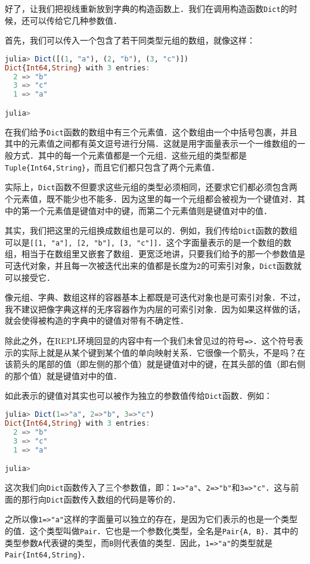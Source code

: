 好了，让我们把视线重新放到字典的构造函数上．我们在调用构造函数\verb|Dict|的时候，还可以传给它几种参数值．

首先，我们可以传入一个包含了若干同类型元组的数组，就像这样：
\begin{lstlisting}[language=julia]
julia> Dict([(1, "a"), (2, "b"), (3, "c")])
Dict{Int64,String} with 3 entries:
  2 => "b"
  3 => "c"
  1 => "a"

julia> 
\end{lstlisting}

在我们给予\verb|Dict|函数的数组中有三个元素值．这个数组由一个中括号包裹，并且其中的元素值之间都有英文逗号进行分隔．这就是用字面量表示一个一维数组的一般方式．其中的每一个元素值都是一个元组．这些元组的类型都是\verb|Tuple{Int64,String}|，而且它们都只包含了两个元素值．

实际上，\verb|Dict|函数不但要求这些元组的类型必须相同，还要求它们都必须包含两个元素值，既不能少也不能多．因为这里的每一个元组都会被视为一个键值对．其中的第一个元素值是键值对中的键，而第二个元素值则是键值对中的值．

其实，我们把这里的元组换成数组也是可以的．例如，我们传给\verb|Dict|函数的数组可以是\verb|[[1, "a"], [2, "b"], [3, "c"]]|．这个字面量表示的是一个数组的数组，相当于在数组里又嵌套了数组．更宽泛地讲，只要我们给予的那一个参数值是可迭代对象，并且每一次被迭代出来的值都是长度为\verb|2|的可索引对象，\verb|Dict|函数就可以接受它．

像元组、字典、数组这样的容器基本上都既是可迭代对象也是可索引对象．不过，我不建议把像字典这样的无序容器作为内层的可索引对象．因为如果这样做的话，就会使得被构造的字典中的键值对带有不确定性．

除此之外，在REPL环境回显的内容中有一个我们未曾见过的符号\verb|=>|．这个符号表示的实际上就是从某个键到某个值的单向映射关系．它很像一个箭头，不是吗？在该箭头的尾部的值（即左侧的那个值）就是键值对中的键，在其头部的值（即右侧的那个值）就是键值对中的值．

如此表示的键值对其实也可以被作为独立的参数值传给\verb|Dict|函数．例如：
\begin{lstlisting}[language=julia]
julia> Dict(1=>"a", 2=>"b", 3=>"c")
Dict{Int64,String} with 3 entries:
  2 => "b"
  3 => "c"
  1 => "a"

julia> 
\end{lstlisting}

这次我们向\verb|Dict|函数传入了三个参数值，即：\verb|1=>"a"|、\verb|2=>"b"|和\verb|3=>"c"|．这与前面的那行向\verb|Dict|函数传入数组的代码是等价的．

之所以像\verb|1=>"a"|这样的字面量可以独立的存在，是因为它们表示的也是一个类型的值．这个类型叫做\verb|Pair|．它也是一个参数化类型，全名是\verb|Pair{A, B}|．其中的类型参数\verb|A|代表键的类型，而\verb|B|则代表值的类型．因此，\verb|1=>"a"|的类型就是\verb|Pair{Int64,String}|．

